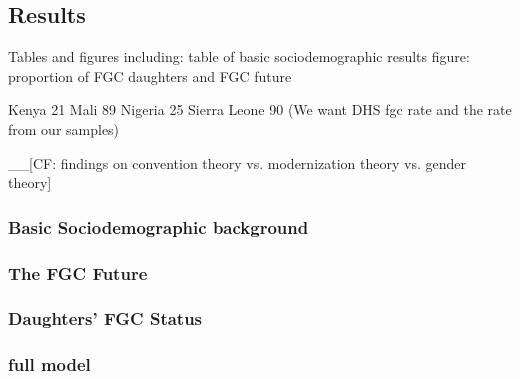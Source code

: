\documentclass[12pt,]{article}
\begin{document}
\subsection{Results}\label{results-1}

Tables and figures including:
table of basic sociodemographic results
figure:  proportion of FGC daughters and FGC future

Kenya 21%
Mali 89%
Nigeria 25%
Sierra Leone 90%
(We want DHS fgc rate and the rate from our samples)

\_\_{[}CF: findings on convention theory vs. modernization theory vs. gender theory{]}

\subsubsection{Basic Sociodemographic background}\label{Basic-Sociodemographic-background}

\subsubsection{The FGC Future}\label{The-FGC-Future}

\subsubsection{Daughters' FGC Status}\label{Daughters'-FGC-Status}

\subsubsection{full model}\label{full-model}


\end{document}
